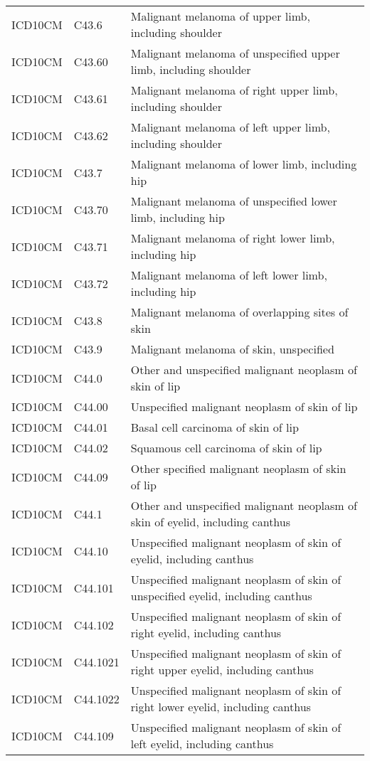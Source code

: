 \begin{longtable}{p{}p{}p{}}
  ICD10CM & C43.6 & Malignant melanoma of upper limb, including shoulder \\ 
  ICD10CM & C43.60 & Malignant melanoma of unspecified upper limb, including shoulder \\ 
  ICD10CM & C43.61 & Malignant melanoma of right upper limb, including shoulder \\ 
  ICD10CM & C43.62 & Malignant melanoma of left upper limb, including shoulder \\ 
  ICD10CM & C43.7 & Malignant melanoma of lower limb, including hip \\ 
  ICD10CM & C43.70 & Malignant melanoma of unspecified lower limb, including hip \\ 
  ICD10CM & C43.71 & Malignant melanoma of right lower limb, including hip \\ 
  ICD10CM & C43.72 & Malignant melanoma of left lower limb, including hip \\ 
  ICD10CM & C43.8 & Malignant melanoma of overlapping sites of skin \\ 
  ICD10CM & C43.9 & Malignant melanoma of skin, unspecified \\ 
  ICD10CM & C44.0 & Other and unspecified malignant neoplasm of skin of lip \\ 
  ICD10CM & C44.00 & Unspecified malignant neoplasm of skin of lip \\ 
  ICD10CM & C44.01 & Basal cell carcinoma of skin of lip \\ 
  ICD10CM & C44.02 & Squamous cell carcinoma of skin of lip \\ 
  ICD10CM & C44.09 & Other specified malignant neoplasm of skin of lip \\ 
  ICD10CM & C44.1 & Other and unspecified malignant neoplasm of skin of eyelid, including canthus \\ 
  ICD10CM & C44.10 & Unspecified malignant neoplasm of skin of eyelid, including canthus \\ 
  ICD10CM & C44.101 & Unspecified malignant neoplasm of skin of unspecified eyelid, including canthus \\ 
  ICD10CM & C44.102 & Unspecified malignant neoplasm of skin of right eyelid, including canthus \\ 
  ICD10CM & C44.1021 & Unspecified malignant neoplasm of skin of right upper eyelid, including canthus \\ 
  ICD10CM & C44.1022 & Unspecified malignant neoplasm of skin of right lower eyelid, including canthus \\ 
  ICD10CM & C44.109 & Unspecified malignant neoplasm of skin of left eyelid, including canthus \\ 

\end{longtable}
